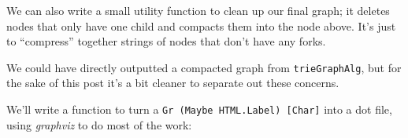 \documentclass[]{article}
\newenvironment{Shaded}{}{}
\newcommand{\CommentTok}[1]{\textcolor[rgb]{0.38,0.63,0.69}{\textit{#1}}}
\newcommand{\DataTypeTok}[1]{\textcolor[rgb]{0.56,0.13,0.00}{#1}}
\newcommand{\KeywordTok}[1]{\textcolor[rgb]{0.00,0.44,0.13}{\textbf{#1}}}
\newcommand{\NormalTok}[1]{#1}
\newcommand{\OperatorTok}[1]{\textcolor[rgb]{0.40,0.40,0.40}{#1}}
\newcommand{\OtherTok}[1]{\textcolor[rgb]{0.00,0.44,0.13}{#1}}
\begin{document}
We can also write a small utility function to clean up our final graph; it
deletes nodes that only have one child and compacts them into the node above.
It's just to ``compress'' together strings of nodes that don't have any forks.

\begin{Shaded}
\end{Shaded}

We could have directly outputted a compacted graph from \texttt{trieGraphAlg},
but for the sake of this post it's a bit cleaner to separate out these concerns.

We'll write a function to turn a \texttt{Gr\ (Maybe\ HTML.Label)\ {[}Char{]}}
into a dot file, using \emph{graphviz} to do most of the work:
\end{document}
